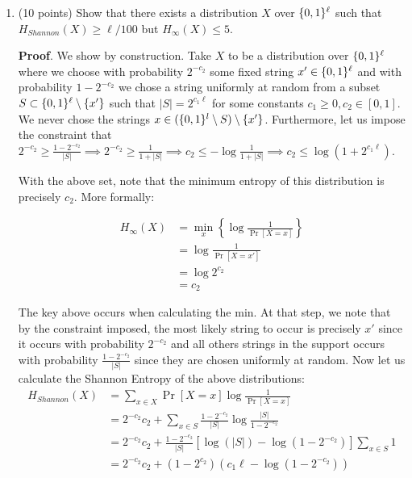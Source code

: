 \documentclass{article}
\begin{document}
\begin{enumerate}[,start=4]
\begin{enumerate}[,label=\alph*.]
\item{}
(10 points) Show that there exists a distribution $X$ over $\{0,1\}^\ell$ such that $H_{Shannon}(X) \geq \ell/100$ but $H_{\infty}(X) \leq 5$.%

\begin{mdbmarginx}{1ex}{0pt}{1ex}{0pt}%
\noindent{}\textbf{Proof}.  We show by construction. Take $X$ to be a distribution over $\{0,1\}^\ell$ where we choose with
probability $2^{-c_2}$ some fixed string $x' \in \{0,1\}^\ell$ and with probability $1 - 2^{-c_2}$ we chose 
a string uniformly at random from a subset $S \subset \{0,1\}^\ell \setminus \{x'\}$ such that $|S| = 2^{c_1 \ell}$
for some constants $c_1 \geq 0, c_2 \in [0,1]$. We never chose the strings $x \in (\{0,1\}^l \setminus S) \setminus \{x'\}$.
Furthermore, let us impose the constraint that $2^{-c_2} \geq \frac{1-2^{-c_2}}{|S|} \implies2^{-c_2} \geq \frac{1}{1 + |S|} \implies c_2 \leq -\log \frac{1}{1 + |S|} \implies c_2 \leq \log(1 + 2^{c_1 \ell})$.%

With the above set, note that the minimum entropy
of this distribution is precisely $c_2$. More formally:%
\end{mdbmarginx}%
\noindent\noindent\[%
\begin{aligned}
H_{\infty}(X) &= \min_x \left\{\log \frac{1}{\Pr[X = x]} \right\} \\
&= \log \frac{1}{\Pr[X = x']} \\
&= \log 2^{c_2} \\
&= c_2
\end{aligned}
\]%

The key above occurs when calculating the min. At that step, we note that by the constraint
imposed, the most likely string to occur is precisely $x'$ since it occurs with probability
$2^{-c_2}$ and all others strings in the support occurs with probability $\frac{1-2^{-c_2}}{|S|}$
since they are chosen uniformly at random. Now let us calculate the Shannon Entropy of the 
above distributions:%
\noindent\noindent\[%
\begin{aligned}
H_{Shannon}(X) &= \sum_{x \in X} \Pr[X = x] \log \frac{1}{\Pr[X = x]} \\
&= 2^{-c_2}c_2 + \sum_{x \in S}\frac{1-2^{-c_2}}{|S|} \log \frac{|S|}{1 - 2^{-c_2}} \\
&= 2^{-c_2}c_2 + \frac{1-2^{-c_2}}{|S|} [\log(|S|) - \log (1 - 2^{-c_2})] \sum_{x \in S} 1 \\
&= 2^{-c_2}c_2 + (1-2^{c_2})(c_1\ell - \log(1 - 2^{-c_2}))
\end{aligned}
\]%


\end{enumerate}
\end{enumerate}
\end{document}
